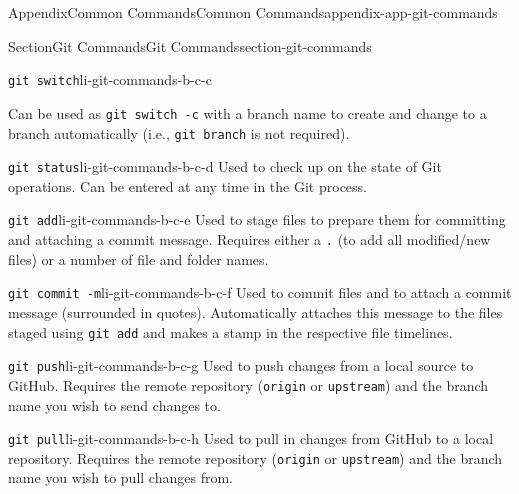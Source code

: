 \documentclass[twoside,10pt,]{book}
\newcommand{\mono}[1]{\texttt{#1}}
\begin{document}
\begin{appendixptx}{Appendix}{Common Commands}{}{Common Commands}{}{}{appendix-app-git-commands}
\begin{sectionptx}{Section}{Git Commands}{}{Git Commands}{}{}{section-git-commands}
\begin{descriptionlist}
\begin{dlimedium}{\mono{git switch}}{li-git-commands-b-c-c}
\par
Can be used as \mono{git switch -c} with a branch name to create and change to a branch automatically (i.e.\@, \mono{git branch} is not required).%
\end{dlimedium}%
\begin{dlimedium}{\mono{git status}}{li-git-commands-b-c-d}%
Used to check up on the state of Git operations. Can be entered at any time in the Git process.%
\end{dlimedium}%
\begin{dlimedium}{\mono{git add}}{li-git-commands-b-c-e}%
Used to stage files to prepare them for committing and attaching a commit message. Requires either a \mono{.} (to add all modified\slash{}new files) or a number of file and folder names.%
\end{dlimedium}%
\begin{dlimedium}{\mono{git commit -m}}{li-git-commands-b-c-f}%
Used to commit files and to attach a commit message (surrounded in quotes). Automatically attaches this message to the files staged using \mono{git add} and makes a stamp in the respective file timelines.%
\end{dlimedium}%
\begin{dlimedium}{\mono{git push}}{li-git-commands-b-c-g}%
Used to push changes from a local source to GitHub. Requires the remote repository (\mono{origin} or \mono{upstream}) and the branch name you wish to send changes to.%
\end{dlimedium}%
\begin{dlimedium}{\mono{git pull}}{li-git-commands-b-c-h}%
Used to pull in changes from GitHub to a local repository. Requires the remote repository (\mono{origin} or \mono{upstream}) and the branch name you wish to pull changes from.%
\end{dlimedium}%
\end{descriptionlist}
%
\end{sectionptx}
\end{appendixptx}
%
%
\typeout{************************************************}
\typeout{************************************************}
%
\end{document}
